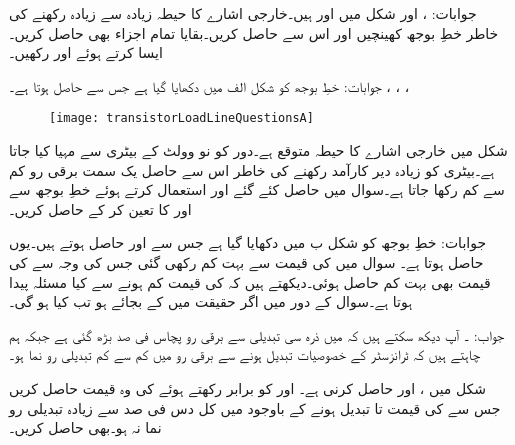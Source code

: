جوابات: ،  اور 
شکل  میں  اور  ہیں۔خارجی اشارے کا حیطہ زیادہ سے زیادہ رکھنے کی خاطر خطِ بوجھ کھینچیں اور اس سے  حاصل کریں۔بقایا تمام اجزاء بھی حاصل کریں۔ایسا کرتے ہوئے    اور  رکھیں۔

جوابات: خطِ بوجھ  کو شکل  الف میں دکھایا گیا ہے جس سے  حاصل ہوتا ہے۔ ، ، ، 
\begin{figure}
\centering
\texttt{[image: transistorLoadLineQuestionsA]}
\caption{}
\label{شکل_سوال_ٹرانزسٹر_بار_خط_الف}
\end{figure}
شکل  میں خارجی اشارے کا حیطہ  متوقع ہے۔دور کو  نو وولٹ کے بیٹری سے  مہیا کیا جاتا ہے۔بیٹری کو زیادہ دیر کارآمد رکھنے کی خاطر اس سے حاصل یک سمت برقی رو کم سے کم رکھا جاتا ہے۔سوال  میں حاصل کئے گئے  اور  استعمال کرتے ہوئے خطِ بوجھ  سے  اور  کا تعین کر کے  حاصل کریں۔

جوابات: خطِ بوجھ  کو شکل  ب میں دکھایا گیا ہے جس سے  اور  حاصل ہوتے ہیں۔یوں  حاصل ہوتا ہے۔
سوال  میں  کی قیمت  سے بہت کم رکھی گئی جس کی وجہ سے  کی قیمت بھی بہت کم حاصل ہوئی۔دیکھتے ہیں کہ  کی قیمت کم ہونے سے کیا مسئلہ پیدا ہوتا ہے۔سوال  کے دور میں اگر حقیقت میں  کے بجائے  ہو تب   کیا ہو گی۔

جواب: ۔ آپ دیکھ سکتے ہیں کہ  میں ذرہ سی تبدیلی سے برقی رو پچاس فی صد  بڑھ گئی ہے جبکہ ہم چاہتے ہیں کہ ٹرانزسٹر کے خصوصیات تبدیل ہونے سے برقی رو میں کم سے کم تبدیلی رو نما ہو۔

شکل  میں  ،  اور  حاصل کرنی ہے۔  اور  کو برابر رکھتے ہوئے  کی وہ قیمت حاصل کریں جس سے  کی قیمت  تا  تبدیل ہونے کے باوجود  میں کل دس فی صد سے زیادہ تبدیلی رو نما نہ ہو۔بھی حاصل کریں۔

